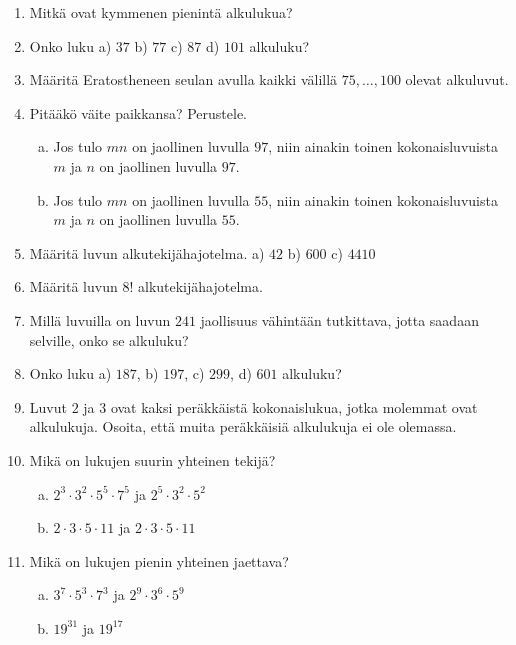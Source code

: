 \begin{enumerate}

\item Mitkä ovat kymmenen pienintä alkulukua?

\item
Onko luku a) $37$ b) $77$ c) $87$ d) $101$ alkuluku?

\item Määritä Eratostheneen seulan avulla kaikki välillä
$75,\ldots, 100$ olevat alkuluvut.

\item Pitääkö väite paikkansa? Perustele.

\begin{enumerate}[a)]
\item Jos tulo $mn$ on jaollinen luvulla $97$, niin ainakin toinen kokonaisluvuista $m$ ja $n$ on jaollinen luvulla $97$.
\item Jos tulo $mn$ on jaollinen luvulla $55$, niin ainakin toinen kokonaisluvuista $m$ ja $n$ on jaollinen luvulla $55$.
\end{enumerate}

\item Määritä luvun alkutekijähajotelma. a) $42$ b) $600$ c)
$4410$

\item Määritä luvun $8!$ alkutekijähajotelma.

\item
Millä luvuilla on luvun $241$ jaollisuus vähintään tutkittava,
jotta saadaan selville, onko se alkuluku?

\item Onko luku a) $187$, b) $197$, c) $299$, d) $601$ alkuluku?

\item Luvut $2$ ja $3$ ovat kaksi peräkkäistä kokonaislukua,
jotka molemmat ovat alkulukuja. Osoita, että muita peräkkäisiä
alkulukuja ei ole olemassa.

\item Mikä on lukujen suurin yhteinen tekijä?
\begin{enumerate}[a)]
\item $2^3 \cdot 3^2 \cdot 5^5 \cdot 7^5$ ja $2^5 \cdot 3^2
\cdot 5^2$
\item $2 \cdot 3 \cdot 5 \cdot 11$ ja $2 \cdot 3 \cdot 5
\cdot 11$
\end{enumerate}

\item Mikä on lukujen pienin yhteinen jaettava?
\begin{enumerate}[a)]
\item $3^7 \cdot 5^3 \cdot 7^3$ ja $2^9 \cdot 3^6 \cdot 5^9$
\item $19^{31}$ ja $19^{17}$
\end{enumerate}


\end{enumerate}
